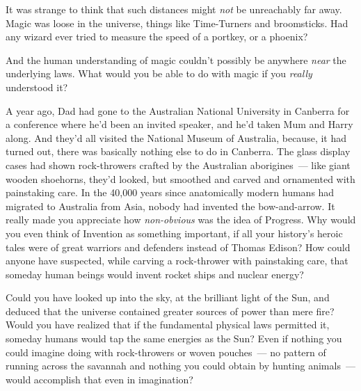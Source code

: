 It was strange to think that such distances might \emph{not} be unreachably far away. Magic was loose in the universe, things like Time-Turners and broomsticks. Had any wizard ever tried to measure the speed of a portkey, or a phoenix?

And the human understanding of magic couldn't possibly be anywhere \emph{near} the underlying laws. What would you be able to do with magic if you \emph{really} understood it?

A year ago, Dad had gone to the Australian National University in Canberra for a conference where he'd been an invited speaker, and he'd taken Mum and Harry along. And they'd all visited the National Museum of Australia, because, it had turned out, there was basically nothing else to do in Canberra. The glass display cases had shown rock-throwers crafted by the Australian aborigines~--- like giant wooden shoehorns, they'd looked, but smoothed and carved and ornamented with painstaking care. In the 40,000 years since anatomically modern humans had migrated to Australia from Asia, nobody had invented the bow-and-arrow. It really made you appreciate how \emph{non-obvious} was the idea of Progress. Why would you even think of Invention as something important, if all your history's heroic tales were of great warriors and defenders instead of Thomas Edison? How could anyone have suspected, while carving a rock-thrower with painstaking care, that someday human beings would invent rocket ships and nuclear energy?

Could you have looked up into the sky, at the brilliant light of the Sun, and deduced that the universe contained greater sources of power than mere fire? Would you have realized that if the fundamental physical laws permitted it, someday humans would tap the same energies as the Sun? Even if nothing you could imagine doing with rock-throwers or woven pouches~--- no pattern of running across the savannah and nothing you could obtain by hunting animals~--- would accomplish that even in imagination?

